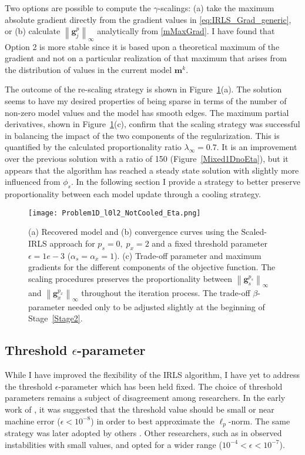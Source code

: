 Two options are possible to compute the $\gamma$-scalings: (a) take the maximum absolute gradient directly from the gradient values in \eqref{eq:IRLS_Grad_generic}, or (b) calculate $\left\|\mathbf{g}_j^p\right\|_\infty$ analytically from \eqref{mMaxGrad}. I have found that Option 2 is more stable since it is based upon a theoretical maximum of the gradient and not on a particular realization of that maximum that arises from the distribution of values in the current model $\mathbf{m}^{k}$.

The outcome of the re-scaling strategy is shown in Figure~\ref{Mixed1DnotCooledEta}(a). The solution seems to have my desired properties of being sparse in terms of the number of non-zero model values and the model has smooth edges. The maximum partial derivatives, shown in Figure~\ref{Mixed1DnotCooledEta}(c), confirm that the scaling strategy was successful in balancing the impact of the two components of the regularization. This is quantified by the calculated proportionality ratio $\lambda_\infty = 0.7$. It is an improvement over the previous solution with a ratio of 150 (Figure~\ref{Mixed1DnoEta}), but it appears that the algorithm has reached a steady state solution with slightly more influenced from $\phi_s$.
In the following section I provide a strategy to better preserve proportionality between each model update through a cooling strategy.
\begin{figure}
\texttt{[image: Problem1D\_l0l2\_NotCooled\_Eta.png]}
\caption{(a) Recovered model and (b) convergence curves using the Scaled-IRLS approach for $p_s=0,\;p_x=2$ and a fixed threshold parameter $\epsilon=1e-3$ ($\alpha_s=\alpha_x=1$). (c) Trade-off parameter and maximum gradients for the different components of the objective function. The scaling procedures preserves the proportionality between $\left\| \mathbf{g}^{p_s}_s \right\|_\infty$ and $\left\| \mathbf{g}^{p_x}_x \right\|_\infty$ throughout the iteration process. The trade-off $\beta$-parameter needed only to be adjusted slightly at the beginning of Stage~\ref{Stage2}.
}
\label{Mixed1DnotCooledEta}
\end{figure}



\subsection{Threshold $\epsilon$-parameter}
While I have improved the flexibility of the IRLS algorithm, I have yet to address the threshold $\epsilon$-parameter which has been held fixed.
The choice of threshold parameters remains a subject of disagreement among researchers.
In the early work of \cite{LastKubik83}, it was suggested that the threshold value should be small or near machine error ($\epsilon < 10^{-8}$) in order to best approximate the $\ell_p$-norm. The same strategy was later adopted by others \cite[]{BarbosaSilva94, Stocco09}.
Other researchers, such as in \cite{Ajo-Franklin07} observed instabilities with small values, and opted for a wider range ($10^{-4} < \epsilon < 10^{-7}$).

